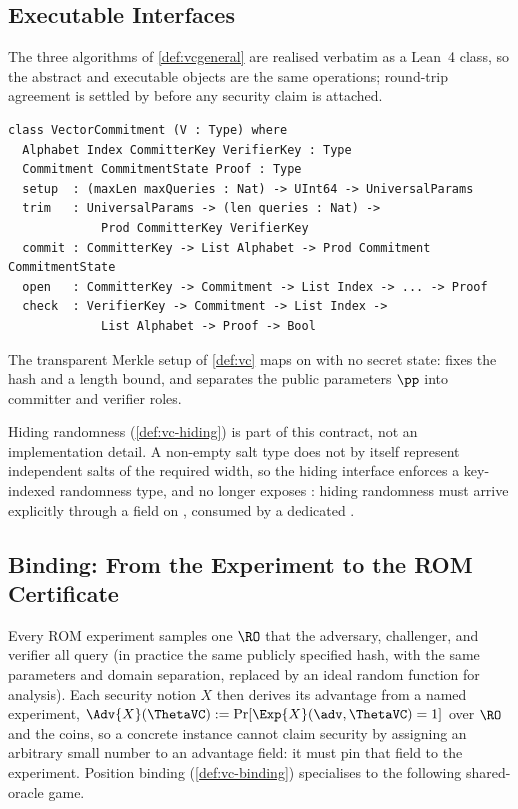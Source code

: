 \label{sec:results}

\subsection{Executable Interfaces} %
\label{sec:interfaces}

The three algorithms of \cref{def:vcgeneral} are realised verbatim as a Lean~4
class, so the abstract and executable objects are the same operations;
round-trip agreement is settled by  before any security
claim is attached.
\begin{verbatim}
class VectorCommitment (V : Type) where
  Alphabet Index CommitterKey VerifierKey : Type
  Commitment CommitmentState Proof : Type
  setup  : (maxLen maxQueries : Nat) -> UInt64 -> UniversalParams
  trim   : UniversalParams -> (len queries : Nat) ->
             Prod CommitterKey VerifierKey
  commit : CommitterKey -> List Alphabet -> Prod Commitment CommitmentState
  open   : CommitterKey -> Commitment -> List Index -> ... -> Proof
  check  : VerifierKey -> Commitment -> List Index ->
             List Alphabet -> Proof -> Bool
\end{verbatim}
The transparent Merkle setup of \cref{def:vc} maps on with no secret state:
 fixes the hash and a length bound, and  separates the
public parameters $\pp$ into committer and verifier roles.

Hiding randomness (\cref{def:vc-hiding}) is part of this contract, not an
implementation detail.  A non-empty salt type does not by itself represent
independent salts of the required width, so the hiding interface enforces a
key-indexed randomness type, and  no longer exposes
: hiding randomness must arrive explicitly through a
 field on
, consumed by a dedicated .

\subsection{Binding: From the Experiment to the ROM Certificate}
\label{sec:binding} %

Every ROM experiment samples one $\RO$ that the adversary, challenger, and
verifier all query (in practice the same publicly specified hash, with the same
parameters and domain separation, replaced by an ideal random function for
analysis).  Each security notion $X$ then derives its advantage from a named
experiment, $\Adv{X}(\ThetaVC):=\Pr[\Exp{X}(\adv,\ThetaVC)=1]$ over $\RO$ and
the coins, so a concrete instance cannot claim security by assigning an
arbitrary small number to an advantage field: it must pin that field to the
experiment.
Position binding (\cref{def:vc-binding}) specialises to the following
shared-oracle game.

